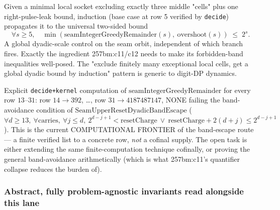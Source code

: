 \begin{thm}
Given a minimal local socket excluding exactly three middle "cells" plus one right-pulse-leak
bound, induction (base case at row 5 verified by \texttt{decide}) propagates it to the universal
two-sided bound
\[
\forall s\ge5,\quad \min(\mathrm{seamIntegerGreedyRemainder}(s),\ \mathrm{overshoot}(s)) \;\le\; 2^s.
\]
A global dyadic-scale control on the seam orbit, independent of which branch fires. Exactly the
ingredient 257bm:c11/c12 needs to make its forbidden-band inequalities well-posed. The "exclude
finitely many exceptional local cells, get a global dyadic bound by induction" pattern is generic
to digit-DP dynamics.
\par\noindent{}     
\end{thm}

\begin{prop}
Explicit \texttt{decide+kernel} computation of $\mathrm{seamIntegerGreedyRemainder}$ for every
row $13$--$31$: row $14\to392$, \dots, row $31\to4187487147$, NONE failing the band-avoidance
condition of $\mathrm{SeamUpperResetDyadicBandEscape}$
($\forall d\ge13,\ \forall\text{carries},\ \forall j\le d,\ 2^{d-j+1}<\mathrm{resetCharge}\ \vee\
\mathrm{resetCharge}+2(d+j)\le2^{d-j+1}$). This is the current COMPUTATIONAL FRONTIER of the
band-escape route — a finite verified list to a concrete row, \emph{not} a cofinal supply. The
open task is either extending the same finite-computation technique cofinally, or proving the
general band-avoidance arithmetically (which is what 257bm:c11's quantifier collapse reduces the
burden of).
\par\noindent{}     
\end{prop}

\subsubsection*{Abstract, fully problem-agnostic invariants read alongside this lane}

